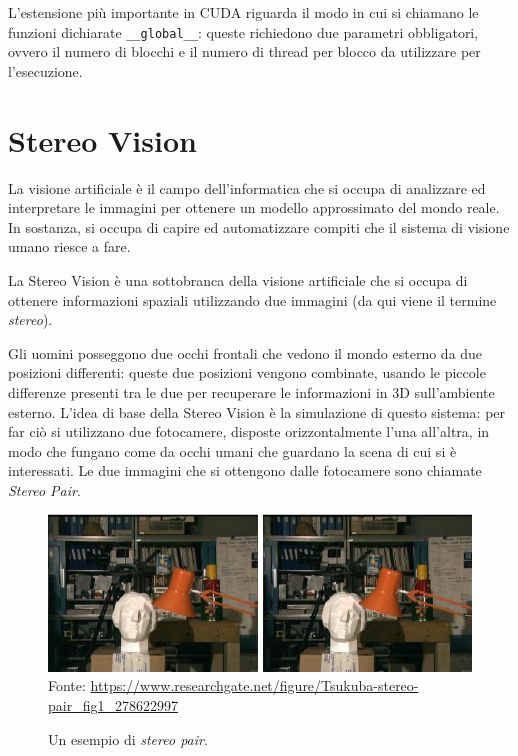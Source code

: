 \documentclass[12pt,a4paper,openright,twoside]{report}
\begin{document}
L'estensione più importante in CUDA riguarda il modo in cui si chiamano le funzioni dichiarate \verb|__global__|: queste richiedono due parametri obbligatori, ovvero il numero di blocchi e il numero di thread per blocco da utilizzare per l'esecuzione.

\chapter{Stereo Vision}

La visione artificiale è il campo dell'informatica che si occupa di analizzare ed interpretare le immagini per ottenere un modello approssimato del mondo reale. In sostanza, si occupa di capire ed automatizzare compiti che il sistema di visione umano riesce a fare.

La Stereo Vision è una sottobranca della visione artificiale che si occupa di ottenere informazioni spaziali utilizzando due immagini (da qui viene il termine \textit{stereo}).

Gli uomini posseggono due occhi frontali che vedono il mondo esterno da due posizioni differenti: queste due posizioni vengono combinate, usando le piccole differenze presenti tra le due per recuperare le informazioni in 3D sull'ambiente esterno. L'idea di base della Stereo Vision è la simulazione di questo sistema: per far ciò si utilizzano due fotocamere, disposte orizzontalmente l'una all'altra, in modo che fungano come da occhi umani che guardano la scena di cui si è interessati. Le due immagini che si ottengono dalle fotocamere sono chiamate \textit{Stereo Pair}.

\begin{figure}[h]
    \centering
    \def\stackalignment{r}
    \stackunder
        {\includegraphics[width=\textwidth]{tsukuba-stereo-pair.png}}
        {\scriptsize Fonte: \url{https://www.researchgate.net/figure/Tsukuba-stereo-pair_fig1_278622997}}
    \caption{Un esempio di \textit{stereo pair}.}
    \label{img:stereo_pair}
\end{figure}
\end{document}
